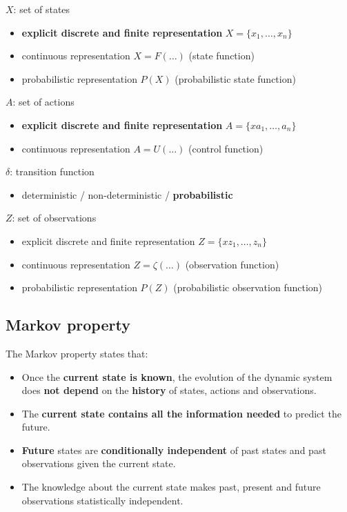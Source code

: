 $X$: set of states
\begin{itemize}
    \item \textbf{explicit discrete and finite representation} $X = \{x_{1}, \dots, x_{n}\}$
    \item continuous representation $X = F(\dots)$ (state function)
    \item probabilistic representation $P(X)$ (probabilistic state function)
\end{itemize}
$A$: set of actions
\begin{itemize}
    \item \textbf{explicit discrete and finite representation} $A = \{xa_{1}, \dots, a_{n}\}$
    \item continuous representation $A = U(\dots)$ (control function)
\end{itemize}
$\delta$: transition function
\begin{itemize}
    \item deterministic / non-deterministic / \textbf{probabilistic}
\end{itemize}
$Z$: set of observations
\begin{itemize}
    \item explicit discrete and finite representation $Z = \{xz_{1}, \dots, z_{n}\}$
    \item continuous representation $Z = \zeta(\dots)$ (observation function)
    \item probabilistic representation $P(Z)$ (probabilistic observation function)
\end{itemize}

\subsection{Markov property}

The Markov property states that: 
\begin{itemize}
    \item Once the \textbf{current state is known}, the evolution of the dynamic system does \textbf{not depend} on the \textbf{history} of states, actions and observations.
    \item The \textbf{current state contains all the information needed} to predict the future.
    \item \textbf{Future} states are \textbf{conditionally independent} of past states and past observations given the current state.
    \item The knowledge about the current state makes past, present and future observations statistically independent.
\end{itemize}

